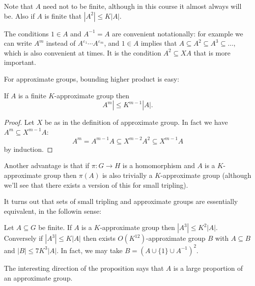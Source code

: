 \documentclass[a4paper]{article}
\begin{document}
\begin{remark}
  Note that \(A\) need not to be finite, although in this course it almost always will be. Also if \(A\) is finite that \(|A^2| \leq K|A|\).
\end{remark}

The conditions \(1 \in A\) and \(A^{-1} = A\) are convenient notationally: for example we can write \(A^m\) instead of \(A^{\varepsilon_1} \cdots A^{\varepsilon_m}\), and \(1 \in A\) implies that \(A \subseteq A^2 \subseteq A^3 \subseteq \dots\), which is also convenient at times. It is the condition \(A^2 \subseteq XA\) that is more important.

For approximate groups, bounding higher product is easy:

\begin{lemma}[lemma 3.1]
  If \(A\) is a finite \(K\)-approximate group then
  \[
    A^m| \leq K^{m - 1}|A|.
  \]
\end{lemma}

\begin{proof}
  Let \(X\) be as in the definition of approximate group. In fact we have \(A^m \subseteq X^{m - 1}A\):
  \[
    A^m
    = A^{m - 1} A
    \subseteq X^{m - 2} A^2
    \subseteq X^{m - 1} A
  \]
  by induction.
\end{proof}

Another advantage is that if \(\pi: G \to H\) is a homomorphism and \(A\) is a \(K\)-approximate group then \(\pi(A)\) is also trivially a \(K\)-approximate group (although we'll see that there exists a version of this for small tripling).

It turns out that sets of small tripling and approximate groups are essentially equivalent, in the followin sense:

\begin{proposition}[proposition 3.2]
  Let \(A \subseteq G\) be finite. If \(A\) is a \(K\)-approximate group then \(|A^3| \leq K^2 |A|\). Conversely if \(|A^3| \leq K |A|\) then exists \(O(K^{12})\)-approximate group \(B\) with \(A \subseteq B\) and \(|B| \leq 7K^3 |A|\). In fact, we may take \(B = (A \cup \{1\} \cup A^{-1})^2\).
\end{proposition}

The interesting direction of the proposition says that \(A\) is a large proportion of an approximate group.
\end{document}
